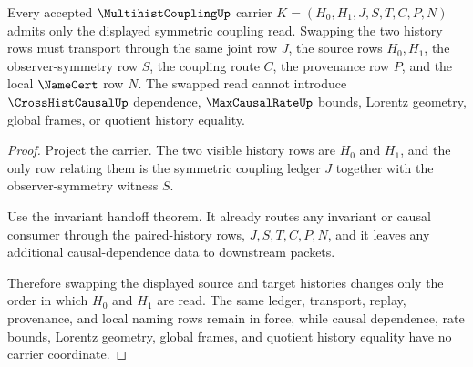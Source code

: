 \begin{theorem}
\label{thm:multihist-coupling-pair-symmetry-obligation}
Every accepted $\MultihistCouplingUp$ carrier $K=(H_0,H_1,J,S,T,C,P,N)$ admits only the displayed symmetric coupling read. Swapping the two history rows must transport through the same joint row $J$, the source rows $H_0,H_1$, the observer-symmetry row $S$, the coupling route $C$, the provenance row $P$, and the local $\NameCert$ row $N$. The swapped read cannot introduce $\CrossHistCausalUp$ dependence, $\MaxCausalRateUp$ bounds, Lorentz geometry, global frames, or quotient history equality.
\end{theorem}
\begin{proof}
Project the carrier. The two visible history rows are $H_0$ and $H_1$, and the only row relating them is the symmetric coupling ledger $J$ together with the observer-symmetry witness $S$.

Use the invariant handoff theorem. It already routes any invariant or causal consumer through the paired-history rows, $J,S,T,C,P,N$, and it leaves any additional causal-dependence data to downstream packets.

Therefore swapping the displayed source and target histories changes only the order in which $H_0$ and $H_1$ are read. The same ledger, transport, replay, provenance, and local naming rows remain in force, while causal dependence, rate bounds, Lorentz geometry, global frames, and quotient history equality have no carrier coordinate.
\end{proof}

